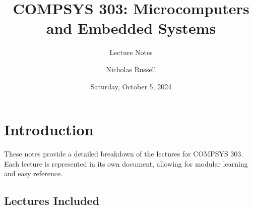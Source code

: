 \documentclass[
  14pt,
  a4paper,
  DIV=11,
  numbers=noendperiod,
  headinclude=true,
  footinclude=true]{scrreprt}
\title{COMPSYS 303: Microcomputers and Embedded Systems}
\subtitle{Lecture Notes}
\author{Nicholas Russell}
\date{Saturday, October 5, 2024}
\renewcommand*\contentsname{Table of contents}
\newcommand\contentsname{Table of contents}
\begin{document}
\maketitle

\renewcommand*\contentsname{Table of contents}
{
\hypersetup{linkcolor=}
\setcounter{tocdepth}{2}
\tableofcontents
}


\chapter*{Introduction}\label{introduction}


These notes provide a detailed breakdown of the lectures for COMPSYS
303. Each lecture is represented in its own document, allowing for
modular learning and easy reference.

\section*{Lectures Included}\label{lectures-included}

\end{document}
